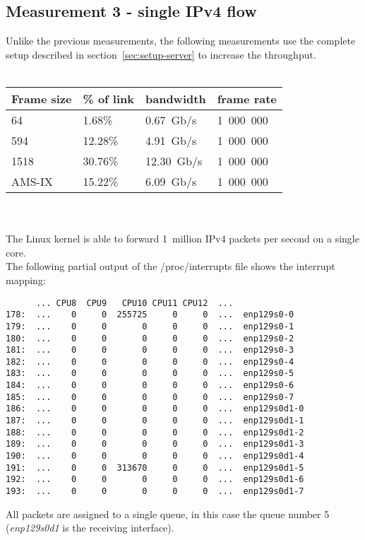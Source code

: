 
\subsection{Measurement 3 - single IPv4 flow}
Unlike the previous measurements,
the following measurements use the complete setup described in section~\ref{sec:setup-server} to increase the throughput.
\\
\\
\begin{tabular}{ | l | l | l | l | }
\hline
Frame size & \% of link & bandwidth & frame rate \\
\hline
64     &  1.68\% &  0.67~Gb/s & 1~000~000 \\
594    & 12.28\% &  4.91~Gb/s & 1~000~000 \\
1518   & 30.76\% & 12.30~Gb/s & 1~000~000 \\
AMS-IX & 15.22\% &  6.09~Gb/s & 1~000~000 \\
\hline
\end{tabular}
\\
\\
The Linux kernel is able to forward 1~million IPv4 packets per second on a single core.
\\
The following partial output of the /proc/interrupts file shows the interrupt mapping:
\begin{lstlisting}
      ... CPU8  CPU9   CPU10 CPU11 CPU12  ...
178:  ...    0     0  255725     0     0  ...  enp129s0-0
179:  ...    0     0       0     0     0  ...  enp129s0-1
180:  ...    0     0       0     0     0  ...  enp129s0-2
181:  ...    0     0       0     0     0  ...  enp129s0-3
182:  ...    0     0       0     0     0  ...  enp129s0-4
183:  ...    0     0       0     0     0  ...  enp129s0-5
184:  ...    0     0       0     0     0  ...  enp129s0-6
185:  ...    0     0       0     0     0  ...  enp129s0-7
186:  ...    0     0       0     0     0  ...  enp129s0d1-0
187:  ...    0     0       0     0     0  ...  enp129s0d1-1
188:  ...    0     0       0     0     0  ...  enp129s0d1-2
189:  ...    0     0       0     0     0  ...  enp129s0d1-3
190:  ...    0     0       0     0     0  ...  enp129s0d1-4
191:  ...    0     0  313670     0     0  ...  enp129s0d1-5
192:  ...    0     0       0     0     0  ...  enp129s0d1-6
193:  ...    0     0       0     0     0  ...  enp129s0d1-7
\end{lstlisting}
All packets are assigned to a single queue, in this case the queue number 5 ({\it{enp129s0d1}} is the receiving interface).
